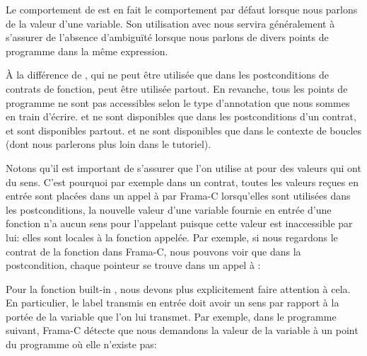 \begin{Information}
Le comportement de  est en fait le comportement par défaut lorsque
nous parlons de la valeur d'une variable. Son utilisation avec  nous 
servira généralement à s'assurer de l'absence d’ambiguïté lorsque nous parlons
de divers points de programme dans la même expression.
\end{Information}


À la différence de , qui ne peut être utilisée que dans les 
postconditions de contrats de fonction,  peut être utilisée partout.
En revanche, tous les points de programme ne sont pas accessibles selon le type
d'annotation que nous sommes en train d'écrire.  et  ne sont 
disponibles que dans les postconditions d'un contrat,  et 
sont disponibles partout.  et  ne sont 
disponibles que dans le contexte de boucles (dont nous parlerons plus loin dans
le tutoriel).


Notons qu'il est important de s'assurer que l'on utilise  at
 pour des valeurs qui ont du sens. C'est pourquoi par
exemple dans un contrat, toutes les valeurs reçues en entrée sont placées dans un
appel à  par Frama-C lorsqu'elles sont utilisées dans
les postconditions, la nouvelle valeur d'une variable fournie en entrée d'une
fonction n'a aucun sens pour l'appelant puisque cette valeur est inaccessible par
lui: elles sont locales à la fonction appelée. Par exemple, si nous regardons le
contrat de la fonction  dans Frama-C, nous pouvons voir que dans
la postcondition, chaque pointeur se trouve dans un appel à  :




Pour la fonction built-in , nous devons plus
explicitement faire attention à cela. En particulier, le label transmis en entrée
doit avoir un sens par rapport à la portée de la variable que l'on lui transmet.
Par exemple, dans le programme suivant, Frama-C détecte que nous demandons la valeur
de la variable  à un point du programme où elle n'existe pas:






